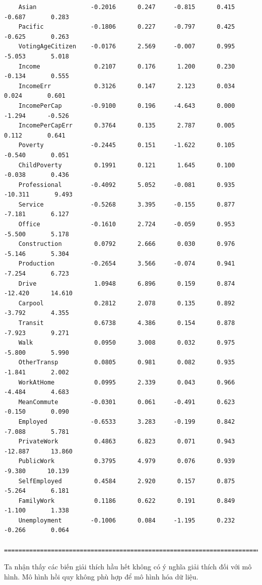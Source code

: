 \documentclass[14pt, a4paper]{article}
\numberwithin{equation}{section}
\numberwithin{figure}{section}
\numberwithin{dl}{section}
\numberwithin{md}{section}
\numberwithin{bd}{section}
\numberwithin{dn}{section}
\numberwithin{hq}{section}
\begin{document}
\begin{verbatim}
    Asian               -0.2016      0.247     -0.815      0.415      -0.687       0.283
    Pacific             -0.1806      0.227     -0.797      0.425      -0.625       0.263
    VotingAgeCitizen    -0.0176      2.569     -0.007      0.995      -5.053       5.018
    Income               0.2107      0.176      1.200      0.230      -0.134       0.555
    IncomeErr            0.3126      0.147      2.123      0.034       0.024       0.601
    IncomePerCap        -0.9100      0.196     -4.643      0.000      -1.294      -0.526
    IncomePerCapErr      0.3764      0.135      2.787      0.005       0.112       0.641
    Poverty             -0.2445      0.151     -1.622      0.105      -0.540       0.051
    ChildPoverty         0.1991      0.121      1.645      0.100      -0.038       0.436
    Professional        -0.4092      5.052     -0.081      0.935     -10.311       9.493
    Service             -0.5268      3.395     -0.155      0.877      -7.181       6.127
    Office              -0.1610      2.724     -0.059      0.953      -5.500       5.178
    Construction         0.0792      2.666      0.030      0.976      -5.146       5.304
    Production          -0.2654      3.566     -0.074      0.941      -7.254       6.723
    Drive                1.0948      6.896      0.159      0.874     -12.420      14.610
    Carpool              0.2812      2.078      0.135      0.892      -3.792       4.355
    Transit              0.6738      4.386      0.154      0.878      -7.923       9.271
    Walk                 0.0950      3.008      0.032      0.975      -5.800       5.990
    OtherTransp          0.0805      0.981      0.082      0.935      -1.841       2.002
    WorkAtHome           0.0995      2.339      0.043      0.966      -4.484       4.683
    MeanCommute         -0.0301      0.061     -0.491      0.623      -0.150       0.090
    Employed            -0.6533      3.283     -0.199      0.842      -7.088       5.781
    PrivateWork          0.4863      6.823      0.071      0.943     -12.887      13.860
    PublicWork           0.3795      4.979      0.076      0.939      -9.380      10.139
    SelfEmployed         0.4584      2.920      0.157      0.875      -5.264       6.181
    FamilyWork           0.1186      0.622      0.191      0.849      -1.100       1.338
    Unemployment        -0.1006      0.084     -1.195      0.232      -0.266       0.064
    ====================================================================================
    \end{verbatim}

    Ta nhận thấy các biến giải thích hầu hết không có ý nghĩa giải thích đối với mô hình.
    Mô hình hồi quy không phù hợp để mô hình hóa dữ liệu.
\end{document}
